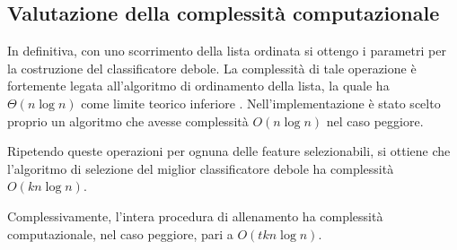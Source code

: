         \subsection{Valutazione della complessità computazionale}
            In definitiva, con uno scorrimento della lista ordinata si ottengo i parametri per la costruzione del classificatore debole. 
            La complessità di tale operazione è fortemente legata all'algoritmo di ordinamento della lista, la quale ha $\Theta(n\log n)$ come limite teorico inferiore \cite[p. 167]{Cormen09}.
            Nell'implementazione è stato scelto proprio un algoritmo che avesse complessità $O(n\log n)$ nel caso peggiore. 

            Ripetendo queste operazioni per ognuna delle feature selezionabili, si ottiene che l'algoritmo di selezione del miglior classificatore debole ha complessità $O(kn \log n)$.

            Complessivamente, l'intera procedura di allenamento ha complessità computazionale, nel caso peggiore, pari a $O(tkn \log n)$.
